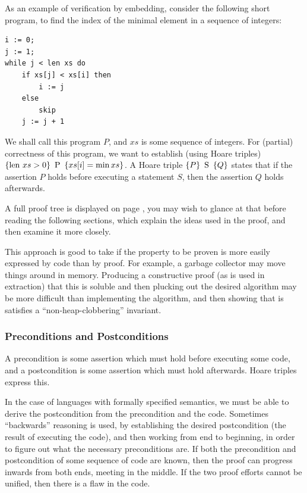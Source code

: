 \begin{example}
  \label{exmpl:lit-embedding}
  As an example of \gls{verification by embedding}, consider the
  following short program, to find the index of the minimal element in
  a sequence of integers:

\begin{verbatim}
i := 0;
j := 1;
while j < len xs do
    if xs[j] < xs[i] then
        i := j
    else
        skip
    j := j + 1
\end{verbatim}

  We shall call this program $P$, and $xs$ is some sequence of
  integers. For (partial) correctness of this program, we want to
  establish (using Hoare triples) $\left\{\mathrm{len}~ xs > 0\right\}\ \mbox{P}\ \left\{xs[i] =
    \min xs\right\}$. A Hoare triple $\left\{P\right\}\ \mbox{S}\ \left\{Q\right\}$ states that if the
  assertion $P$ holds before executing a statement $S$, then the
  assertion $Q$ holds afterwards.

  A full proof tree is displayed on page
  \pageref{sec:lit-verification-embedding-example}, you may wish to
  glance at that before reading the following sections, which explain
  the ideas used in the proof, and then examine it more closely.
\end{example}

This approach is good to take if the property to be proven is more
easily expressed by code than by proof. For example, a garbage
collector may move things around in memory. Producing a constructive
proof (as is used in extraction) that this is soluble and then
plucking out the desired algorithm may be more difficult than
implementing the algorithm, and then showing that is satisfies a
``non-heap-clobbering'' invariant.

\subsubsection{Preconditions and Postconditions}
\label{sec:lit-verification-embedding-conditions}

A precondition is some assertion which must hold before executing some
code, and a postcondition is some assertion which must hold
afterwards. Hoare triples express this.

In the case of languages with formally specified semantics, we must be
able to derive the postcondition from the precondition and the
code. Sometimes ``backwards'' reasoning is used, by establishing the
desired postcondition (the result of executing the code), and then
working from end to beginning, in order to figure out what the
necessary preconditions are. If both the precondition and
postcondition of some sequence of code are known, then the proof can
progress inwards from both ends, meeting in the middle. If the two
proof efforts cannot be unified, then there is a flaw in the code.

